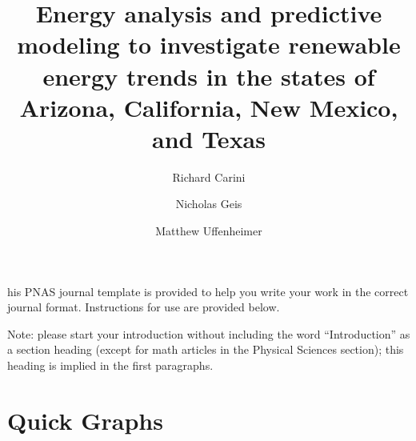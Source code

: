 \documentclass[9pt,twocolumn,twoside]{pnas-new}
\title{Energy analysis and predictive modeling to investigate renewable energy trends in the states of Arizona, California, New Mexico, and Texas }
\author{Richard Carini}
\author{Nicholas Geis}
\author{Matthew Uffenheimer}
\affil{University of California, Santa Barbara, Mathematics Department}
\begin{document}
\verticaladjustment{-2pt}

\maketitle
\thispagestyle{firststyle}

his PNAS journal template is provided to help you write your work in the correct journal format.  Instructions for use are provided below.

Note: please start your introduction without including the word ``Introduction'' as a section heading (except for math articles in the Physical Sciences section); this heading is implied in the first paragraphs. 

\section*{Quick Graphs}
\end{document}
